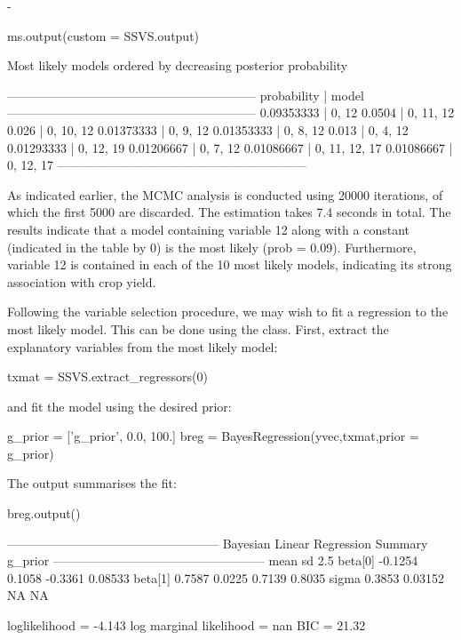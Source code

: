 -\documentclass[article]{jss}
\begin{document}
\begin{CodeChunk}
\begin{CodeInput}
ms.output(custom = SSVS.output)
\end{CodeInput}
\begin{CodeOutput}
Most likely models ordered by decreasing posterior probability

------------------------------------------------------------
probability | model       
------------------------------------------------------------
0.09353333  | 0, 12       
0.0504      | 0, 11, 12   
0.026       | 0, 10, 12   
0.01373333  | 0, 9, 12    
0.01353333  | 0, 8, 12    
0.013       | 0, 4, 12    
0.01293333  | 0, 12, 19   
0.01206667  | 0, 7, 12    
0.01086667  | 0, 11, 12, 17
0.01086667  | 0, 12, 17   
------------------------------------------------------------
\end{CodeOutput}
\end{CodeChunk}

As indicated earlier, the MCMC analysis is conducted using 20000
iterations, of which the first 5000 are discarded. The estimation
takes 7.4 seconds in total.  The results indicate that a model
containing variable 12 along with a constant (indicated in the table
by 0) is the most likely (prob = 0.09). Furthermore, variable 12 is
contained in each of the 10 most likely models, indicating its strong
association with crop yield.

Following the variable selection procedure, we may wish to fit a
regression to the most likely model. This can be done using the
 class. First, extract the explanatory variables
from the most likely model:
\begin{Code}
txmat = SSVS.extract_regressors(0)
\end{Code}
and fit the model using the desired prior:
\begin{Code}
g_prior = ['g_prior', 0.0, 100.]
breg = BayesRegression(yvec,txmat,prior = g_prior)
\end{Code}

The output summarises the fit:
\begin{CodeChunk}
\begin{CodeInput}
breg.output()
\end{CodeInput}
\begin{CodeOutput}
          ---------------------------------------------------           
                   Bayesian Linear Regression Summary                   
                                g_prior                                 
          ---------------------------------------------------           
                    mean          sd         2.5%
     beta[0]     -0.1254      0.1058      -0.3361     0.08533
     beta[1]      0.7587      0.0225       0.7139      0.8035
       sigma      0.3853     0.03152          NA         NA

loglikelihood = -4.143      
log marginal likelihood = nan         
BIC  = 21.32       
\end{CodeOutput}
\end{CodeChunk}
\end{document}

